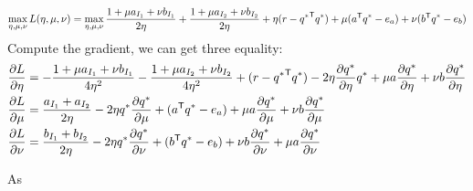 \begin{equation}
\max_{\eta,\mu,\nu}  L(\eta,\mu,\nu) = \max_{\eta,\mu,\nu} \frac{1+\mu a_{I_1} + \nu b_{I_1}}{2\eta}  +\frac{1+\mu a_{I_2} + \nu b_{I_2}}{2\eta}+ \eta(r - {q^{*}}^{\mathsf T}q^{*} )+\mu( a^{\mathsf T}q^{*} - e_a ) + \nu( b^{\mathsf T}q^{*} - e_b )
\end{equation}
Compute the gradient, we can get three equality:
\begin{equation}
\begin{split} 
\frac{\partial L}{\partial \eta} &= -\frac{1+\mu a_{I_1} + \nu b_{I_1}}{4\eta^2} -  \frac{1+\mu a_{I_2} + \nu b_ {I_2}}{4\eta^2} + (r - {q^{*}}^{\mathsf T}q^{*} ) - 2\eta\frac{\partial q^{*}}{\partial \eta}q^{*} +\mu a \frac{\partial q^{*}}{\partial \eta} + \nu b \frac{\partial q^{*}}{\partial \eta}\\
\frac{\partial L}{\partial \mu} &= \frac{a_{I_1} + a_{I_2}}{2\eta} - 2 \eta q^{*}\frac{\partial q^{*}}{\partial \mu} +( a^{\mathsf T}q^{*} - e_a ) + \mu a \frac{\partial q^{*}}{\partial \mu} + \nu b \frac{\partial q^{*}}{\partial \mu} \\
\frac{\partial L}{\partial \nu} &= \frac{b_{I_1} + b_{I_2}}{2\eta} - 2 \eta q^{*}\frac{\partial q^{*}}{\partial \nu} +( b^{\mathsf T}q^{*} - e_b ) + \nu b \frac{\partial q^{*}}{\partial \nu} + \mu a \frac{\partial q^{*}}{\partial \nu} 
 \end{split}
\end{equation}

As 


